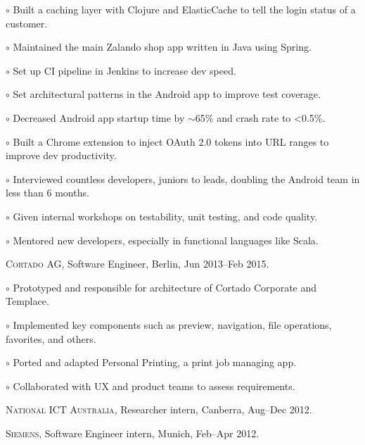 \documentclass[letterpaper]{article}
\renewenvironment{itemize}{
  \begin{list}{}{
    \setlength{\leftmargin}{1.5em}
  }
}{
  \end{list}
}
\newenvironment{no-indent-itemize}{
  \begin{list}{}{
    \setlength{\leftmargin}{0em}
  }
}{
  \end{list}
}
\def\tilde{$\scriptstyle\sim$}
\def\bullet{$\circ$\xspace}
\begin{document}
\begin{no-indent-itemize}
\begin{itemize}
    \item\bullet Built a caching layer with Clojure and ElasticCache to tell the login status of a customer.
    \item\bullet Maintained the main Zalando shop app written in Java using Spring.
    \item\bullet Set up CI pipeline in Jenkins to increase dev speed.
    \item\bullet Set architectural patterns in the Android app to improve test coverage.
    \item\bullet Decreased Android app startup time by \tilde 65\% and crash rate to <0.5\%.
    \item\bullet Built a Chrome extension to inject OAuth 2.0 tokens into URL ranges to improve dev productivity.
    \item\bullet Interviewed countless developers, juniors to leads, doubling the Android team in less than 6 months.
    \item\bullet Given internal workshops on testability, unit testing, and code quality.
    \item\bullet Mentored new developers, especially in functional languages like Scala.
  \end{itemize}
  \item \textsc{Cortado AG}, Software Engineer, Berlin, Jun 2013--Feb 2015.
  \begin{itemize}
    \item\bullet Prototyped and responsible for architecture of Cortado Corporate and Templace.
    \item\bullet Implemented key components such as preview, navigation, file operations, favorites, and others.
    \item\bullet Ported and adapted Personal Printing, a print job managing app.
    \item\bullet Collaborated with UX and product teams to assess requirements.
  \end{itemize}
  \item \textsc{National ICT Australia}, Researcher intern, Canberra, Aug--Dec 2012. 
  \item \textsc{Siemens}, Software Engineer intern, Munich, Feb--Apr 2012.

\end{no-indent-itemize}
\end{document}
